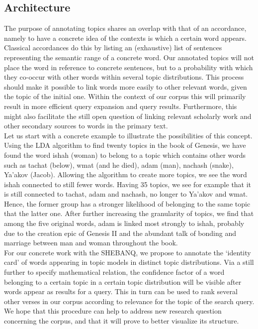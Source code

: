 \documentclass[10pt,a4paper]{article}
\begin{document}
\subsection{Architecture}
The purpose of annotating topics shares an overlap with that of an accordance, namely to have a concrete idea of the contexts is which a certain word appears. Classical accordances do this by listing an (exhaustive) list of sentences representing the semantic range of a concrete word. Our annotated topics will not place the word in reference to concrete sentences, but to a probability with which they co-occur with other words within several topic distributions. This process should make it possible to link words more easily to other relevant words, given the topic of the initial one. Within the context of our corpus this will primarily result in more efficient query expansion and query results. Furthermore, this might also facilitate the still open question of linking relevant scholarly work and other secondary sources to words in the primary text. 
\\Let us start with a concrete example to illustrate the possibilities of this concept. Using the LDA algorithm to find twenty topics in the book of Genesis, we have found the word ishah (woman) to belong to a topic which contains other words such as tachat (below), wmat (and he died), adam (man), nachash (snake), Ya’akov (Jacob). Allowing the algorithm to create more topics, we see the word ishah connected to still fewer words. Having 35 topics, we see for example that it is still connected to tachat, adam and nachash, no longer to Ya’akov and wmat. Hence, the former group has a stronger likelihood of belonging to the same topic that the latter one. After further increasing the granularity of topics, we find that among the five original words, adam is linked most strongly to ishah, probably due to the creation epic of Genesis II and the abundant talk of bonding and marriage between man and woman throughout the book.
\\For our concrete work with the SHEBANQ, we propose to annotate the ‘identity card’ of words appearing in topic models in distinct topic distributions. Via a still further to specify mathematical relation, the confidence factor of a word belonging to a certain topic in a certain topic distribution will be visible after words appear as results for a query. This in turn can be used to rank several other verses in our corpus according to relevance for the topic of the search query. We hope that this procedure can help to address new research question concerning the corpus, and that it will prove to better visualize its structure.
\end{document}
